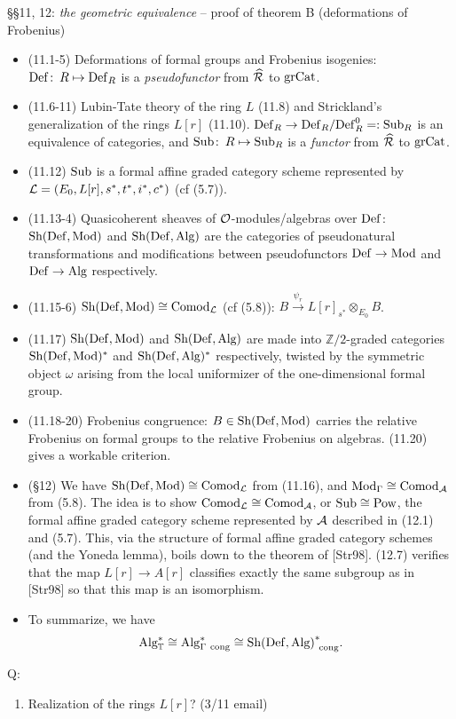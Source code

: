 \documentclass{rs}
\theoremstyle{definition}
\theoremstyle{remark}
\def\co{\colon\thinspace}
\newcommand{\mb}[1]{\mathbb{#1}}
\renewcommand{\=}{\approx}
\renewcommand{\-}{\sim}
\numberwithin{equation}{section}
\numberwithin{thm}{section}
\begin{document}
\S\S 11, 12: {\em the geometric equivalence} -- proof of theorem B (deformations of Frobenius)
\begin{itemize}
 \item (11.1-5) Deformations of formal groups and Frobenius isogenies: ${\rm Def} \co R \mapsto {\rm Def}_R$ is a {\em pseudofunctor} from $\widehat{\cal R}$ to $\rm grCat$.

 \item (11.6-11) Lubin-Tate theory of the ring $L$ (11.8) and Strickland's generalization of the rings $L[r]$ (11.10). 
 ${\rm Def}_R \to {\rm Def}_R / {\rm Def}_R^0 =: {\rm Sub}_R$ is an equivalence of categories, and ${\rm Sub} \co R \mapsto {\rm Sub}_R$ is a {\em functor} from $\widehat{\cal R}$ to $\rm grCat$.

 \item (11.12) $\rm Sub$ is a formal affine graded category scheme represented by ${\cal L} = (E_0, L[r], s^*, t^*, i^*, c^*)$ (cf (5.7)).

 \item (11.13-4) Quasicoherent sheaves of $\cal O$-modules/algebras over $\rm Def$: $\rm Sh (Def, Mod)$ and $\rm Sh (Def, Alg)$ 
 are the categories of pseudonatural transformations and modifications between pseudofunctors $\rm Def \to Mod$ and $\rm Def \to Alg$ respectively.

 \item (11.15-6) $\rm Sh (Def, Mod) \cong Comod_{\cal L}$ (cf (5.8)): $B \stackrel{\psi_r}{\to} L[r]_{s^*} \otimes_{E_0} B$.

 \item (11.17) $\rm Sh (Def, Mod)$ and $\rm Sh (Def, Alg)$ are made into $\mb Z/2$-graded categories $\rm Sh (Def, Mod)^*$ and $\rm Sh (Def, Alg)^*$ respectively, twisted by the symmetric object $\omega$ arising from the local uniformizer of the one-dimensional formal group.

 \item (11.18-20) Frobenius congruence: $B \in \rm Sh (Def, Mod)$ carries the relative Frobenius on formal groups to the relative Frobenius on algebras. (11.20) gives a workable criterion.

 \item (\S 12) We have $\rm Sh (Def, Mod) \cong Comod_{\cal L}$ from (11.16), and $\rm Mod_\Gamma \cong Comod_{\cal A}$ from (5.8). 
 The idea is to show $\rm Comod_{\cal L} \cong Comod_{\cal A}$, or $\rm Sub \cong Pow$, the formal affine graded category scheme represented by $\cal A$ described in (12.1) and (5.7).
 This, via the structure of formal affine graded category schemes (and the Yoneda lemma), boils down to the theorem of [Str98]. (12.7) verifies  that the map $L[r] \to A[r]$ 
 classifies exactly the same subgroup as in [Str98] so that this map is an isomorphism.

 \item To summarize, we have 
 \[
  {\rm Alg}_{\mb T}^* \cong {\rm Alg}_{\Gamma~\rm cong}^* \cong {\rm Sh (Def, Alg)}^*_{~\rm cong}.
 \]

\end{itemize}
Q:
\begin{enumerate}
 \item Realization of the rings $L[r]$? (3/11 email)
\end{enumerate}
\end{document}

